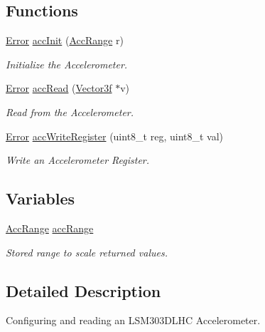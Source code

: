 \subsection*{Functions}
\begin{DoxyCompactItemize}
\item 
\hyperlink{group__error_ga2c3e4bb40f36b262a5214e2da2bca9c5}{Error} \hyperlink{group__acc_ga7674eb1b940f183abe5e0b0913a87613}{acc\-Init} (\hyperlink{group__acc_ga3d56e56c162b045de727006a11880324}{Acc\-Range} r)
\begin{DoxyCompactList}\small\item\em Initialize the Accelerometer. \end{DoxyCompactList}\item 
\hyperlink{group__error_ga2c3e4bb40f36b262a5214e2da2bca9c5}{Error} \hyperlink{group__acc_ga4dd55defcab17af4ecc29562a5a28ab3}{acc\-Read} (\hyperlink{struct_vector3f}{Vector3f} $\ast$v)
\begin{DoxyCompactList}\small\item\em Read from the Accelerometer. \end{DoxyCompactList}\item 
\hyperlink{group__error_ga2c3e4bb40f36b262a5214e2da2bca9c5}{Error} \hyperlink{group__acc_ga277bcee14b8033f6da9790a8afe03348}{acc\-Write\-Register} (uint8\-\_\-t reg, uint8\-\_\-t val)
\begin{DoxyCompactList}\small\item\em Write an Accelerometer Register. \end{DoxyCompactList}\end{DoxyCompactItemize}
\subsection*{Variables}
\begin{DoxyCompactItemize}
\item 
\hyperlink{group__acc_ga3d56e56c162b045de727006a11880324}{Acc\-Range} \hyperlink{group__acc_ga450bb9262f697cdcab7185674b9fc6a3}{acc\-Range}
\begin{DoxyCompactList}\small\item\em Stored range to scale returned values. \end{DoxyCompactList}\end{DoxyCompactItemize}


\subsection{Detailed Description}
Configuring and reading an L\-S\-M303\-D\-L\-H\-C Accelerometer. 

